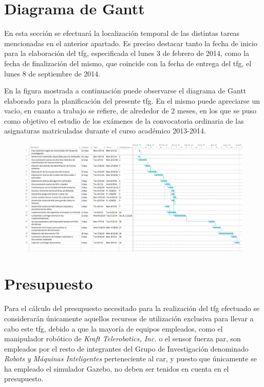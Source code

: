 \section*{Diagrama de Gantt}

En esta sección se efectuará la localización temporal de las distintas tareas mencionadas en el anterior apartado. Es preciso destacar tanto la fecha de inicio para la elaboración del \acrfull{tfg}, especificada el lunes 3 de febrero de 2014, como la fecha de finalización del mismo, que coincide con la fecha de entrega del \acrshort{tfg}, el lunes 8 de septiembre de 2014. \par 

En la figura mostrada a continuación puede observarse el diagrama de Gantt elaborado para la planificación del presente \acrshort{tfg}. En el mismo puede apreciarse un vacío, en cuanto a trabajo se refiere, de alrededor de 2 meses, en los que se puso como objetivo el estudio de los exámenes de la convocatoria ordinaria de las asignaturas matriculadas durante el curso académico 2013-2014. \par 

\begin{landscape}
\thispagestyle{empty}
\begin{figure}[h!]
\includegraphics[width=\hsize, height=\vsize]{Figuras/Gantt}
\end{figure}
\end{landscape}
\restoregeometry

\section*{Presupuesto}

Para el cálculo del presupuesto necesitado para la realización del \acrlong{tfg} efectuado se considerarán únicamente aquellos recursos de utilización exclusiva para llevar a cabo este \acrshort{tfg}, debido a que la mayoría de equipos empleados, como el manipulador robótico de \emph{Kraft Telerobotics, Inc.} o el sensor fuerza par, son empleados por el resto de integrantes del Grupo de Investigación denominado \emph{Robots y Máquinas Inteligentes} perteneciente al \acrfull{car}, y puesto que únicamente se ha empleado el simulador Gazebo, no deben ser tenidos en cuenta en el presupuesto. \par

